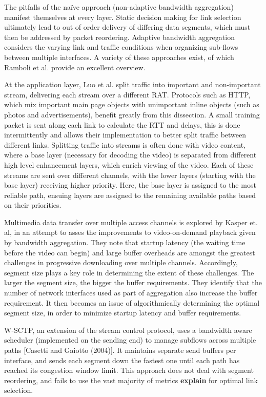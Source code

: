 \documentclass[12pt]{article}
\newcommand{\comment}[1]
{{\bfseries \color{blue} #1}}
\begin{document}
	The pitfalls of the na\"{i}ve approach (non-adaptive bandwidth aggregation) manifest themselves at every layer. Static decision making for link selection ultimately lead to out of order delivery of differing data segments, which must then be addressed by packet reordering. Adaptive bandwidth aggregation considers the varying link and traffic conditions when organizing sub-flows between multiple interfaces. A variety of these approaches exist, of which Ramboli et al. provide an excellent overview. 

	At the application layer, Luo et al. \cite{1204756} split traffic into important and non-important stream, delivering each stream over a different RAT. Protocols such as HTTP, which mix important main page objects with unimportant inline objects (such as photos and advertisements), benefit greatly from this dissection. A small training packet is sent along each link to calculate the RTT and delays, this is done intermittently and allows their implementation to better split traffic between different links. Splitting traffic into streams is often done with video content, where a base layer (necessary for decoding the video) is separated from different high level enhancement layers, which enrich viewing of the video. Each of these streams are sent over different channels, with the lower layers (starting with the base layer) receiving higher priority. Here, the base layer is assigned to the most reliable path, ensuing layers are assigned to the remaining available paths based on their priorities\cite{1363842}.

	Multimedia data transfer over multiple access channels is explored by Kasper et. al, in an attempt to asses the improvements to video-on-demand playback given by bandwidth aggregation. They note that startup latency (the waiting time before the video can begin) and large buffer overheads are amongst the greatest challenges in progressive downloading over multiple channels. Accordingly, segment size plays a key role in determining the extent of these challenges. The larger the segment size, the bigger the buffer requirements. They identify that the number of network interfaces used as part of aggregation also increase the buffer requirement. It then becomes an issue of algorithmically determining the optimal segment size, in order to minimize startup latency and buffer requirements\cite{5421846}.

	W-SCTP, an extension of the stream control protocol, uses a bandwidth aware scheduler (implemented on the sending end) to manage subflows across multiple paths [Casetti and Gaiotto (2004)]. It maintains separate send buffers per interface, and sends each segment down the fastest one until each path has reached its congestion window limit. This approach does not deal with segment reordering, and fails to use the vast majority of metrics\comment{explain} for optimal link selection. 
\end{document}
